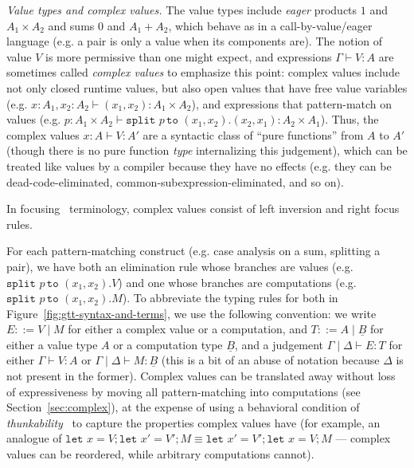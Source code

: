 \documentclass[acmsmall,screen,12pt]{acmart}
\renewcommand{\u}{\underline}
\newcommand{\lett}{\kw{let}}
\newcommand{\letXbeYinZ}[2]{\lett#2 = #1;}
\newcommand{\kw}[1]{\texttt{#1}\,\,}
\newcommand{\pmpairWtoXYinZ}[4]{\kw{split} #1\,\kw{to} (#2,#3). #4}
\begin{document}
\emph{Value types and complex values.}
The value types include \emph{eager} products $1$ and $A_1 \times A_2$
and sums $0$ and $A_1 + A_2$, which behave as in a call-by-value/eager
language (e.g. a pair is only a value when its components are).  The
notion of value $V$ is more permissive than one might expect, and
expressions $\Gamma \vdash V : A$ are sometimes called \emph{complex
  values} to emphasize this point: complex values include not only
closed runtime values, but also open values that have free value
variables (e.g. $x : A_1 , x_2 : A_2 \vdash (x_1,x_2) : A_1 \times
A_2$), and expressions that pattern-match on values (e.g. $p : A_1
\times A_2 \vdash \pmpairWtoXYinZ{p}{x_1}{x_2}{(x_2,x_1)} : A_2 \times
A_1$).  Thus, the complex values $x : A \vdash V : A'$ are a syntactic
class of ``pure functions'' from $A$ to $A'$ (though there is no pure
function \emph{type} internalizing this judgement), which can be treated
like values by a compiler because they have no effects (e.g. they can be
dead-code-eliminated, common-subexpression-eliminated, and so on).
\begin{longonly}
In focusing~\cite{andreoli92focus} terminology, complex
values consist of left inversion and right focus rules.
\end{longonly}
For each pattern-matching construct (e.g. case analysis on a sum,
splitting a pair), we have both an elimination rule whose branches are
values (e.g. $\pmpairWtoXYinZ{p}{x_1}{x_2}{V}$) and one whose branches
are computations (e.g. $\pmpairWtoXYinZ{p}{x_1}{x_2}{M}$).  To
abbreviate the typing rules for both in
Figure~\ref{fig:gtt-syntax-and-terms}, we use the following convention:
we write $E ::= V \mid M$ for either a complex value or a computation,
and $T ::= A \mid \u B$ for either a value type $A$ or a computation
type $\u B$, and a judgement $\Gamma \mid \Delta \vdash E : T$ for
either $\Gamma \vdash V : A$ or $\Gamma \mid \Delta \vdash M : \u B$
(this is a bit of an abuse of notation because $\Delta$ is not present
in the former).  Complex values can be translated away without loss of
expressiveness by moving all pattern-matching into computations (see
Section~\ref{sec:complex}), at the expense of using a behavioral
condition of \emph{thunkability}~\cite{munchmaccagnoni14nonassociative} to capture the properties
complex values have (for example, an analogue of
$\letXbeYinZ{V}{x}{\letXbeYinZ{V'}{x'}{M}} \equiv
\letXbeYinZ{V'}{x'}{\letXbeYinZ{V}{x}{M}}$ --- complex values can be
reordered, while arbitrary computations cannot).  
\end{document}
